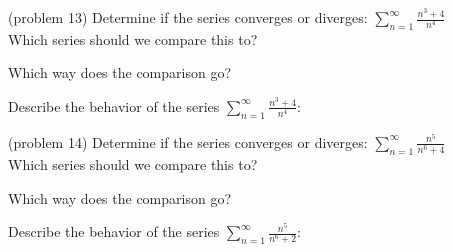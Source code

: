 \documentclass[handout]{ximera}
\begin{document}
\begin{problem}(problem 13)
Determine if the series converges or diverges: $\displaystyle{\sum_{n=1}^\infty \frac{n^3+4}{n^4}}$\\
Which series should we compare this to?

\begin{multipleChoice}
\end{multipleChoice}

Which way does the comparison go?
\begin{multipleChoice}
\end{multipleChoice}

Describe the behavior of the series $\sum_{n=1}^\infty \frac{n^3 + 4}{n^4}:$
\begin{multipleChoice}
\end{multipleChoice}

\end{problem}





\begin{problem}(problem 14)
Determine if the series converges or diverges: $\displaystyle{\sum_{n=1}^\infty \frac{n^5}{n^6 + 4}}$\\
Which series should we compare this to?

\begin{multipleChoice}
\end{multipleChoice}

Which way does the comparison go?
\begin{multipleChoice}
\end{multipleChoice}

Describe the behavior of the series $\sum_{n=1}^\infty \frac{n^5}{n^6 + 2}:$
\begin{multipleChoice}
\end{multipleChoice}

\end{problem}
\end{document}
